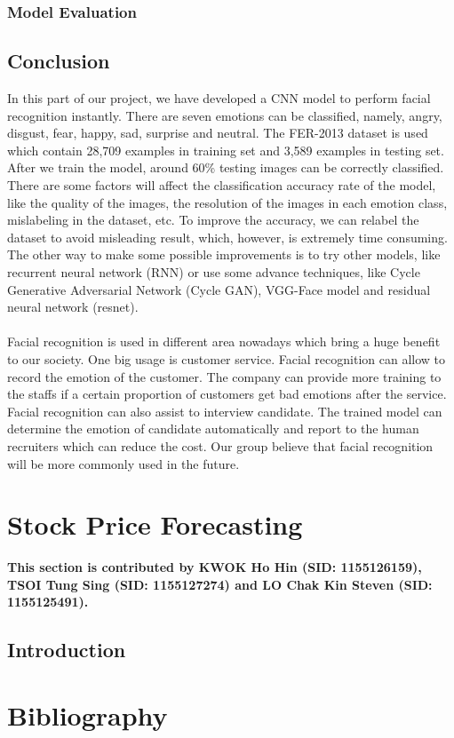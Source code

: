 \documentclass[11pt,a4paper]{article}
\begin{document}
    \subsubsection{Model Evaluation}
    
    
    \subsection{Conclusion}
    In this part of our project, we have developed a CNN model to perform facial recognition instantly. There are seven emotions can be classified, namely, angry, disgust, fear, happy, sad, surprise and neutral. The FER-2013 dataset is used which contain 28,709 examples in training set and 3,589 examples in testing set. After we train the model, around 60\% testing images can be correctly classified. There are some factors will affect the classification accuracy rate of the model, like the quality of the images, the resolution of the images in each emotion class, mislabeling in the dataset, etc. To improve the accuracy, we can relabel the dataset to avoid misleading result, which, however, is extremely time consuming. The other way to make some possible improvements is to try other models, like recurrent neural network (RNN) or use some advance techniques, like Cycle Generative Adversarial Network (Cycle GAN), VGG-Face model and residual neural network (resnet). \\
    \\
    Facial recognition is used in different area nowadays which bring a huge benefit to our society. One big usage is customer service. Facial recognition can allow to record the emotion of the customer. The company can provide more training to the staffs if a certain proportion of customers get bad emotions after the service. Facial recognition can also assist to interview candidate. The trained model can determine the emotion of candidate automatically and report to the human recruiters which can reduce the cost. Our group believe that facial recognition will be more commonly used in the future.

    
    \newpage
    \section{Stock Price Forecasting}
    \textbf{This section is contributed by KWOK Ho Hin (SID: 1155126159), TSOI Tung Sing (SID: 1155127274) and LO Chak Kin Steven (SID: 1155125491).}
    
    \subsection{Introduction}
    
    
    \newpage
    \section{Bibliography}
    
    
\end{document}
